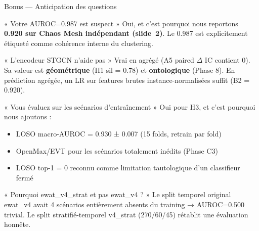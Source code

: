 \documentclass[10pt,aspectratio=169]{beamer}
\begin{document}
\begin{frame}{Bonus --- Anticipation des questions}

  \begin{block}{« Votre AUROC=0.987 est suspect »}
    Oui, et c'est pourquoi nous reportons \textbf{0.920 sur Chaos Mesh indépendant
    (slide~2)}. Le 0.987 est explicitement étiqueté comme cohérence interne du clustering.
  \end{block}

  \begin{block}{« L'encodeur STGCN n'aide pas »}
    Vrai en agrégé (A5 paired $\Delta$ IC contient 0). Sa valeur est \textbf{géométrique}
    (H1 sil = 0.78) et \textbf{ontologique} (Phase 8). En prédiction agrégée, un
    LR sur features brutes instance-normalisées suffit (B2 = 0.920).
  \end{block}

  \begin{block}{« Vous évaluez sur les scénarios d'entraînement »}
    Oui pour H3, et c'est pourquoi nous ajoutons :
    \begin{itemize}
      \item LOSO macro-AUROC = 0.930 ± 0.007 (15 folds, retrain par fold)
      \item OpenMax/EVT pour les scénarios totalement inédits (Phase C3)
      \item LOSO top-1 = 0 reconnu comme limitation tautologique d'un classifieur fermé
    \end{itemize}
  \end{block}

  \begin{block}{« Pourquoi ewat\_v4\_strat et pas ewat\_v4 ? »}
    Le split temporel original ewat\_v4 avait 4 scénarios entièrement absents du
    training → AUROC=0.500 trivial. Le split stratifié-temporel v4\_strat (270/60/45)
    rétablit une évaluation honnête.
  \end{block}

\end{frame}
\end{document}
